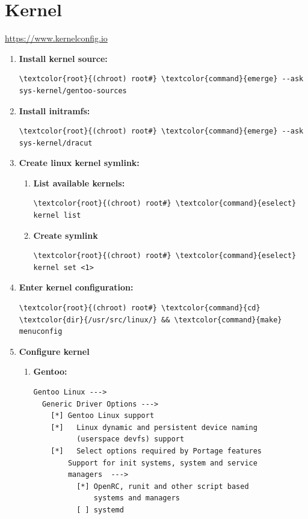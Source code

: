 \documentclass[10pt, a4paper, onecolumn, oneside, titlepage, openany]{book}
\begin{document}
\section{Kernel}
\url{https://www.kernelconfig.io}
\begin{enumerate}
    \item \textbf{Install kernel source:}
\begin{Verbatim}[commandchars=\\\{\}]
\textcolor{root}{(chroot) root#} \textcolor{command}{emerge} --ask sys-kernel/gentoo-sources
\end{Verbatim}
    \item \textbf{Install initramfs:}
\begin{Verbatim}[commandchars=\\\{\}]
\textcolor{root}{(chroot) root#} \textcolor{command}{emerge} --ask sys-kernel/dracut
\end{Verbatim}
    \item \textbf{Create linux kernel symlink:}
    \begin{enumerate}
        \item \textbf{List available kernels:}
\begin{Verbatim}[commandchars=\\\{\}]
\textcolor{root}{(chroot) root#} \textcolor{command}{eselect} kernel list
\end{Verbatim}
        \item \textbf{Create symlink}
\begin{Verbatim}[commandchars=\\\{\}]
\textcolor{root}{(chroot) root#} \textcolor{command}{eselect} kernel set <1>
\end{Verbatim}
    \end{enumerate}
    \item \textbf{Enter kernel configuration:}
\begin{Verbatim}[commandchars=\\\{\}]
\textcolor{root}{(chroot) root#} \textcolor{command}{cd} \textcolor{dir}{/usr/src/linux/} && \textcolor{command}{make} menuconfig
\end{Verbatim}
    \item \textbf{Configure kernel}
    \begin{enumerate}
\item \textbf{Gentoo:}
\begin{Verbatim}[commandchars=\\\{\}]
Gentoo Linux --->
  Generic Driver Options --->
    [*] Gentoo Linux support
    [*]   Linux dynamic and persistent device naming
          (userspace devfs) support
    [*]   Select options required by Portage features
        Support for init systems, system and service
        managers  --->
          [*] OpenRC, runit and other script based
              systems and managers
          [ ] systemd


\end{Verbatim}
\end{enumerate}
\end{enumerate}
\end{document}
